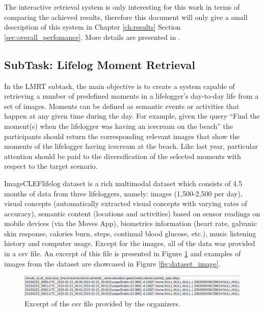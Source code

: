 The interactive retrieval system is only interesting for this work in terms of comparing the achieved results, therefore this document will only give a small description of this system in Chapter \ref{ch:results} Section \ref{sec:overall_perfomance}. More details are presented in \cite{Ribeiro2020}.

    \subsection{SubTask: Lifelog Moment Retrieval}
    In the LMRT subtask, the main objective is to create a system capable of retrieving a number of predefined moments in a lifelogger’s day-to-day life from a set of images. Moments can be defined as semantic events or activities that happen at any given time during the day. For example, given the query “Find the moment(s) when the lifelogger was having an icecream on the beach” the participants should return the corresponding relevant images that show the moments of the lifelogger having icecream at the beach. Like last year, particular attention should be paid to the diversification of the selected moments with respect to the target scenario.

    ImageCLEFlifelog dataset is a rich multimodal dataset which consists of 4.5 months of data from three lifeloggers, namely: images (1,500-2,500 per day), visual concepts (automatically extracted visual concepts with varying rates of accuracy), semantic content (locations and activities) based on sensor readings on mobile devices (via the Moves App), biometrics information (heart rate, galvanic skin response, calories burn, steps, continual blood glucose, etc.), music listening history and computer usage. 
    Except for the images, all of the data was provided in a csv file. An excerpt of this file is presented in Figure \ref{fig:dataset_csv} and examples of images from the dataset are showcased in Figure \ref{fig:dataset_image}.

    \begin{figure}[htb]
        
        \centering
 
        \captionsetup{justification=centering}
        \includegraphics[width =  \textwidth]{Sections/5ImageClef/images/dataset.png}
        \caption[Provided csv file.]{Excerpt of the csv file provided by the organizers.}  
       \label{fig:dataset_csv}
    \end{figure}


